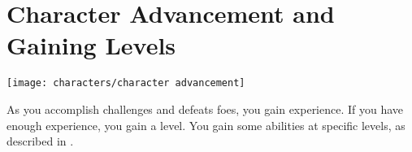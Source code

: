 

\section{Character Advancement and Gaining Levels}\label{Character Advancement and Gaining Levels}
    \texttt{[image: characters/character advancement]}

    As you accomplish challenges and defeats foes, you gain experience.
    If you have enough experience, you gain a level.
    You gain some abilities at specific levels, as described in .

